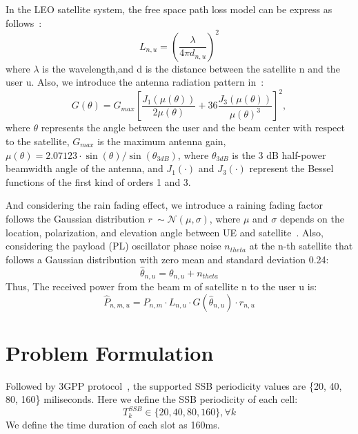 In the LEO satellite system, the free space path loss model can be express as follows~\cite{Satellite-Multi-Beam}:
\begin{equation}
    L_{n,u} = \left(\frac{\lambda}{4\pi d_{n,u}}\right)^2
\end{equation}
where $\lambda$ is the wavelength,and d is the distance between the satellite n and the user u.
Also, we introduce the antenna radiation pattern in~\cite{Energy-Efficient}:
\begin{equation}
G(\theta) = G_{max} \left[ \frac{J_1\left(\mu(\theta)\right)}{2\mu(\theta)} 
+ 36 \frac{J_3\left(\mu(\theta)\right)}{\mu(\theta)^3} \right]^2,
\end{equation}
where $\theta$ represents the angle between the user and the beam center with respect to the satellite, $G_{max}$ is the maximum antenna gain, $\mu(\theta) = 2.07123\cdot \sin(\theta)/\sin(\theta_{3dB})$, 
where $\theta_{3dB}$ is the 3 dB half-power beamwidth angle of the antenna, and $J_1(\cdot)$ and $J_3(\cdot)$ represent the Bessel functions of the first kind of orders 1 and 3.

And considering the rain fading effect, we introduce a raining fading factor follows the Gaussian distribution $r~\sim \mathcal{N}(\mu, \sigma)$, where $\mu$ and $\sigma$
depends on the location, polarization, and elevation angle between UE and satellite~\cite{User-Scheduling}. 
Also, considering the payload (PL) oscillator phase noise $n_{theta}$ at the n-th satellite that follows a Gaussian distribution with zero mean and standard deviation 0.24:
\begin{equation}
    \hat\theta_{n,u} = \theta_{n,u} + n_{theta}
\end{equation}
Thus, The received power from the beam m of satellite n to the user u is:
\begin{equation}
    \hat{P}_{n,m,u} = P_{n,m} \cdot L_{n,u} \cdot G(\hat\theta_{n,u}) \cdot r_{n,u}
\end{equation}

\section{Problem Formulation}

Followed by 3GPP protocol~\cite{38331}, the supported SSB periodicity values are 
\{20, 40, 80, 160\} miliseconds. Here we define the SSB periodicity of each cell:
\begin{equation}
    T^{SSB}_{k}\in\{20, 40, 80, 160\}, \forall k
\end{equation}
We define the time duration of each slot as 160ms. 


    

